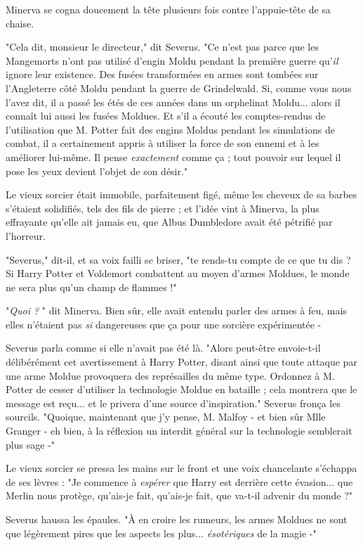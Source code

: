 Minerva se cogna doucement la tête plusieurs fois contre l'appuie-tête de sa chaise.

"Cela dit, monsieur le directeur," dit Severus. "Ce n'est pas parce que les Mangemorts n'ont pas utilisé d'engin Moldu pendant la première guerre qu'\emph{il}  ignore leur existence. Des fusées transformées en armes sont tombées sur l'Angleterre côté Moldu pendant la guerre de Grindelwald. Si, comme vous nous l'avez dit, il a passé les étés de ces années dans un orphelinat Moldu... alors il connaît lui aussi les fusées Moldues. Et s'il a écouté les comptes-rendus de l'utilisation que M. Potter fait des engins Moldus pendant les simulations de combat, il a certainement appris à utiliser la force de son ennemi et à les améliorer lui-même. Il pense \emph{exactement}  comme ça ; tout pouvoir sur lequel il pose les yeux devient l'objet de son désir."

Le vieux sorcier était immobile, parfaitement figé, même les cheveux de sa barbes s'étaient solidifiés, tels des fils de pierre ; et l'idée vint à Minerva, la plus effrayante qu'elle ait jamais eu, que Albus Dumbledore avait été pétrifié par l'horreur.

"Severus," dit-il, et sa voix failli se briser, "te rends-tu compte de ce que tu dis ? Si Harry Potter et Voldemort combattent au moyen d'armes Moldues, le monde ne sera plus qu'un champ de flammes !"

"\emph{Quoi ?} " dit Minerva. Bien sûr, elle avait entendu parler des armes à feu, mais elles n'étaient pas \emph{si}  dangereuses que ça pour une sorcière expérimentée -

Severus parla comme si elle n'avait pas été là. "Alors peut-être envoie-t-il délibérément cet avertissement à Harry Potter, disant ainsi que toute attaque par une arme Moldue provoquera des représailles du même type. Ordonnez à M. Potter de cesser d'utiliser la technologie Moldue en bataille ; cela montrera que le message est reçu... et le privera d'une source d'inspiration." Severus fronça les sourcils. "Quoique, maintenant que j'y pense, M. Malfoy - et bien sûr Mlle Granger - eh bien, à la réflexion un interdit général sur la technologie semblerait plus sage -"

Le vieux sorcier se pressa les mains sur le front et une voix chancelante s'échappa de ses lèvres : "Je commence à \emph{espérer}  que Harry est derrière cette évasion... que Merlin nous protège, qu'ais-je fait, qu'ais-je fait, que va-t-il advenir du monde ?"

Severus haussa les épaules. "À en croire les rumeurs, les armes Moldues ne sont que légèrement pires que les aspects les plus... \emph{ésotériques}  de la magie -"

